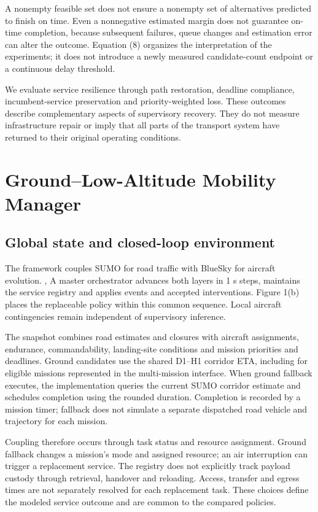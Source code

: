 \documentclass[]{interact}
\theoremstyle{plain}
\theoremstyle{definition}
\theoremstyle{remark}
\begin{document}
A nonempty feasible set does not ensure a nonempty set of alternatives predicted to finish on time. Even a nonnegative estimated margin does not guarantee on-time completion, because subsequent failures, queue changes and estimation error can alter the outcome. Equation (8) organizes the interpretation of the experiments; it does not introduce a newly measured candidate-count endpoint or a continuous delay threshold.

We evaluate service resilience through path restoration, deadline compliance, incumbent-service preservation and priority-weighted loss. These outcomes describe complementary aspects of supervisory recovery. They do not measure infrastructure repair or imply that all parts of the transport system have returned to their original operating conditions.

\section{Ground--Low-Altitude Mobility Manager}

\subsection{Global state and closed-loop environment}

The framework couples SUMO for road traffic with BlueSky for aircraft evolution. \citep{ref12}, \citep{ref13} A master orchestrator advances both layers in 1 s steps, maintains the service registry and applies events and accepted interventions. Figure 1(b) places the replaceable policy within this common sequence. Local aircraft contingencies remain independent of supervisory inference.

The snapshot combines road estimates and closures with aircraft assignments, endurance, commandability, landing-site conditions and mission priorities and deadlines. Ground candidates use the shared D1--H1 corridor ETA, including for eligible missions represented in the multi-mission interface. When ground fallback executes, the implementation queries the current SUMO corridor estimate and schedules completion using the rounded duration. Completion is recorded by a mission timer; fallback does not simulate a separate dispatched road vehicle and trajectory for each mission.

Coupling therefore occurs through task status and resource assignment. Ground fallback changes a mission's mode and assigned resource; an air interruption can trigger a replacement service. The registry does not explicitly track payload custody through retrieval, handover and reloading. Access, transfer and egress times are not separately resolved for each replacement task. These choices define the modeled service outcome and are common to the compared policies.
\end{document}

